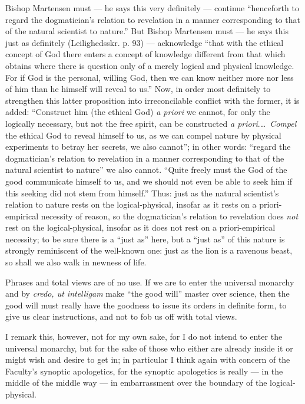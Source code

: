 \documentclass[12pt]{book}
\newcommand{\opage}[1]{\marginnote{\footnotesize\textit{[#1]}}}
\begin{document}
Bishop Martensen must --- he says this very definitely ---
\opage{68}\setcounter{footnote}{0}%
continue ``henceforth to regard the dogmatician's relation to revelation in a manner corresponding to that of the natural scientist to nature.'' But Bishop Martensen must --- he says this just as definitely (Leilighedsskr. p. 93) --- acknowledge ``that with the ethical concept of God there enters a concept of knowledge different from that which obtains where there is question only of a merely logical and physical knowledge. For if God is the personal, willing God, then we can know neither more nor less of him than he himself will reveal to us.'' Now, in order most definitely to strengthen this latter proposition into irreconcilable conflict with the former, it is added: ``Construct him (the ethical God) \textit{a priori} we cannot, for only the logically necessary, but not the free spirit, can be constructed \textit{a priori}.\dots\ \emph{Compel} the ethical God to reveal himself to us, as we can compel nature by physical experiments to betray her secrets, we also cannot''; in other words: ``regard the dogmatician's relation to revelation in a manner corresponding to that of the natural scientist to nature'' we also cannot. ``Quite freely must the God of the good communicate himself to us, and we should not even be able to seek him if this seeking did not stem from himself.'' Thus: just as the natural scientist's relation to nature rests on the logical-physical, insofar as it rests on a priori-empirical necessity of reason, so the dogmatician's relation to revelation does \emph{not} rest on the logical-physical, insofar as it does not rest on a priori-empirical necessity; to be sure there is a ``just as'' here, but a ``just as'' of this nature is strongly reminiscent of the well-known one: just as the lion is a ravenous beast, so shall we also walk in newness of life.

Phrases and total views are of no use. If we are to enter the universal monarchy and by \textit{credo, ut intelligam} make ``the good will'' master over science, then the good will must really have the goodness to issue its orders in definite form, to give us clear instructions, and not to fob us off with total views.

\opage{69}\setcounter{footnote}{0}%
I remark this, however, not for my own sake, for I do not intend to enter the universal monarchy, but for the sake of those who either are already inside it or might wish and desire to get in; in particular I think again with concern of the Faculty's synoptic apologetics, for the synoptic apologetics is really --- in the middle of the middle way --- in embarrassment over the boundary of the logical-physical.
\end{document}
